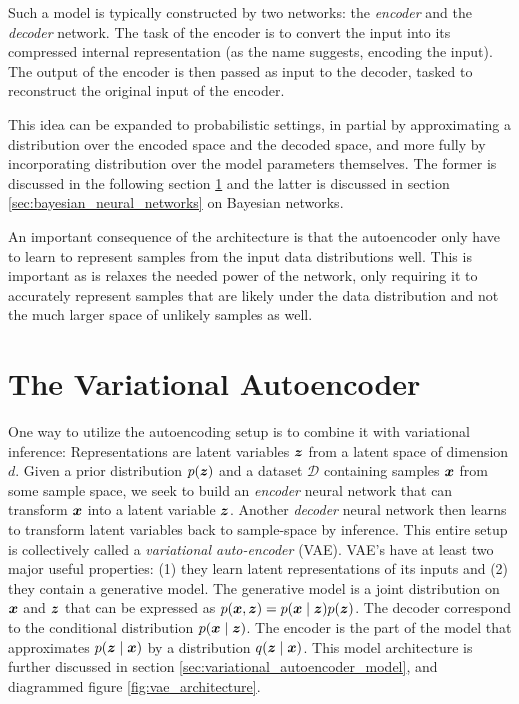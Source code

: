 Such a model is typically constructed by two networks: the \textit{encoder} and the \textit{decoder} network. The task of the encoder is to convert the input into its compressed internal representation (as the name suggests, encoding the input). The output of the encoder is then passed as input to the decoder, tasked to reconstruct the original input of the encoder.

This idea can be expanded to probabilistic settings, in partial by approximating a distribution over the encoded space and the decoded space, and more fully by incorporating distribution over the model parameters themselves. The former is discussed in the following section \ref{sec:variational_autoencoder} and the latter is discussed in section \ref{sec:bayesian_neural_networks} on Bayesian networks.

An important consequence of the architecture is that the autoencoder only have to learn to represent samples from the input data distributions well. This is important as is relaxes the needed power of the network, only requiring it to accurately represent samples that are likely under the data distribution and not the much larger space of unlikely samples as well.
\section{The Variational Autoencoder}
\label{sec:variational_autoencoder}

One way to utilize the autoencoding setup is to combine it with variational inference: Representations are latent variables $\bm{ z }$ from a latent space of dimension $d$. Given a prior distribution $p{\mathopen{} \left( \bm{ z } \right) \mathclose{}}$ and a dataset $\mathcal{D}$ containing samples $\bm{ x }$ from some sample space, we seek to build an \textit{encoder} neural network that can transform $\bm{ x }$ into a latent variable $\bm{ z }$. Another \textit{decoder} neural network then learns to transform latent variables back to sample-space by inference. This entire setup is collectively called a \textit{variational auto-encoder} (VAE).
VAE's have at least two major useful properties: (1) they learn latent representations of its inputs and (2) they contain a generative model. The generative model is a joint distribution on $\bm{ x }$ and $\bm{ z }$ that can be expressed as $p(\bm{ x }, \bm{ z }) = p(\bm{ x } \mid \bm{ z }) p(\bm{ z })$. The decoder correspond to the conditional distribution $p(\bm{ x } \mid \bm{ z })$. The encoder is the part of the model that approximates $p(\bm{ z } \mid \bm{ x })$ by a distribution $q(\bm{ z } \mid \bm{ x })$. This model architecture is further discussed in section \ref{sec:variational_autoencoder_model}, and diagrammed figure \ref{fig:vae_architecture}.

